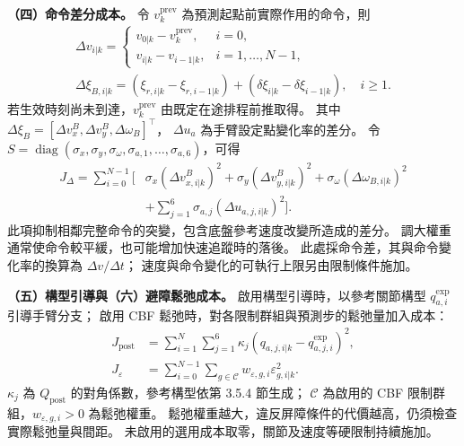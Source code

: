 \noindent\textbf{（四）命令差分成本。}
令 $v_k^{\mathrm{prev}}$ 為預測起點前實際作用的命令，則
\begin{equation}
    \begin{gathered}
        \Delta v_{i|k}=
        \begin{cases}
            v_{0|k}-v_k^{\mathrm{prev}},&i=0,\\
            v_{i|k}-v_{i-1|k},&i=1,\ldots,N-1,
        \end{cases}\\
        \Delta\xi_{B,i|k}=
        (\xi_{r,i|k}-\xi_{r,i-1|k})
        +(\delta\xi_{i|k}-\delta\xi_{i-1|k}),\quad i\geq1 .
    \end{gathered}
    \label{eq:ch3_command_difference_definition}
\end{equation}
若生效時刻尚未到達，$v_k^{\mathrm{prev}}$ 由既定在途排程前推取得。
其中 $\Delta\xi_B=[\Delta v_x^B,\Delta v_y^B,\Delta\omega_B]^\top$，
$\Delta u_a$ 為手臂設定點變化率的差分。
令 $S=\operatorname{diag}(\sigma_x,\sigma_y,\sigma_\omega,
\sigma_{a,1},\ldots,\sigma_{a,6})$，可得
\begin{equation}
    \begin{aligned}
        J_\Delta=\sum_{i=0}^{N-1}\big[&
        \sigma_x(\Delta v_{x,i|k}^{B})^{2}
        +\sigma_y(\Delta v_{y,i|k}^{B})^{2}
        +\sigma_\omega(\Delta\omega_{B,i|k})^{2}\\
        &+\sum_{j=1}^{6}\sigma_{a,j}(\Delta u_{a,j,i|k})^{2}\big].
    \end{aligned}
    \label{eq:ch3_smoothness_cost_expanded}
\end{equation}
此項抑制相鄰完整命令的突變，包含底盤參考速度改變所造成的差分。
調大權重通常使命令較平緩，也可能增加快速追蹤時的落後。
此處採命令差，其與命令變化率的換算為 $\Delta v/\Delta t$；
速度與命令變化的可執行上限另由限制條件施加。

\noindent\textbf{（五）構型引導與（六）避障鬆弛成本。}
啟用構型引導時，以參考關節構型 $q_{a,i}^{\mathrm{exp}}$ 引導手臂分支；
啟用 CBF 鬆弛時，對各限制群組與預測步的鬆弛量加入成本：
\begin{equation}
    \begin{aligned}
        J_{\mathrm{post}}
        &=\sum_{i=1}^{N}\sum_{j=1}^{6}
        \kappa_j(q_{a,j,i|k}-q_{a,j,i}^{\mathrm{exp}})^2,\\
        J_\varepsilon
        &=\sum_{i=0}^{N-1}\sum_{g\in\mathcal C}
        w_{\varepsilon,g,i}\varepsilon_{g,i|k}^{2} .
    \end{aligned}
    \label{eq:ch3_optional_cost_terms}
\end{equation}
$\kappa_j$ 為 $Q_{\mathrm{post}}$ 的對角係數，參考構型依第 3.5.4 節生成；
$\mathcal C$ 為啟用的 CBF 限制群組，$w_{\varepsilon,g,i}>0$ 為鬆弛權重。
鬆弛權重越大，違反屏障條件的代價越高，仍須檢查實際鬆弛量與間距。
未啟用的選用成本取零，關節及速度等硬限制持續施加。

